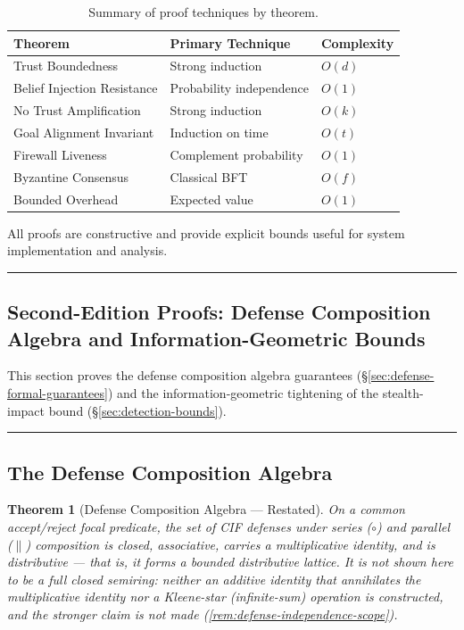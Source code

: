 \documentclass[
]{article}
\newtheorem{theorem}{Theorem}[section]
\begin{document}
\begin{table}[htbp]
\centering
\caption{Summary of proof techniques by theorem.}
\label{tab:proof-summary}
\begin{tabular}{@{}lll@{}}
\toprule
Theorem & Primary Technique & Complexity \\
\midrule
Trust Boundedness & Strong induction & $O(d)$ \\
Belief Injection Resistance & Probability independence & $O(1)$ \\
No Trust Amplification & Strong induction & $O(k)$ \\
Goal Alignment Invariant & Induction on time & $O(t)$ \\
Firewall Liveness & Complement probability & $O(1)$ \\
Byzantine Consensus & Classical BFT & $O(f)$ \\
Bounded Overhead & Expected value & $O(1)$ \\
\bottomrule
\end{tabular}
\end{table}

All proofs are constructive and provide explicit bounds useful for
system implementation and analysis.

\begin{center}\rule{0.5\linewidth}{0.5pt}\end{center}

\subsection{Second-Edition Proofs: Defense Composition Algebra and
Information-Geometric Bounds}\label{sec:v2-proofs}

This section proves the defense composition algebra guarantees
(§\ref{sec:defense-formal-guarantees}) and the information-geometric
tightening of the stealth-impact bound (§\ref{sec:detection-bounds}).

\begin{center}\rule{0.5\linewidth}{0.5pt}\end{center}

\subsection{The Defense Composition
Algebra}\label{sec:thm-composition-semiring}

\begin{theorem}[Defense Composition Algebra --- Restated]
\label{thm:composition-semiring-restated}
On a common accept/reject focal predicate, the set of CIF defenses under series ($\circ$) and parallel ($\parallel$) composition is closed, associative, carries a multiplicative identity, and is distributive --- that is, it forms a bounded distributive lattice. It is \emph{not} shown here to be a full closed semiring: neither an additive identity that annihilates the multiplicative identity nor a Kleene-star (infinite-sum) operation is constructed, and the stronger claim is not made (\cref{rem:defense-independence-scope}).
\end{theorem}
\end{document}
